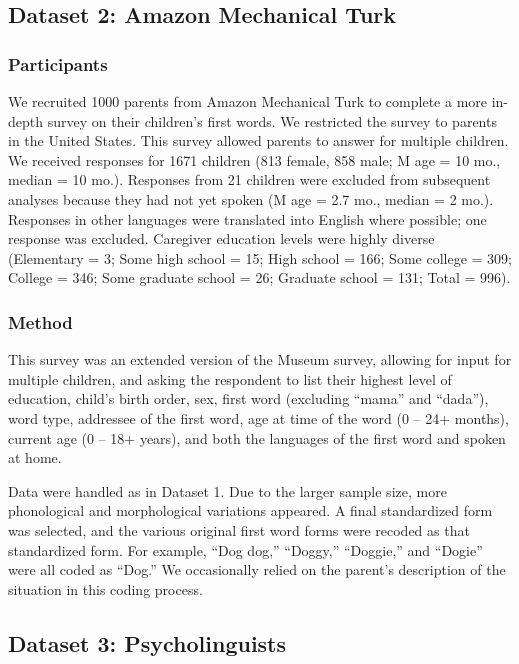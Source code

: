 \documentclass[10pt,letterpaper]{article}
\begin{document}
\subsection{Dataset 2: Amazon Mechanical Turk}

\subsubsection{Participants}

We recruited 1000 parents from Amazon Mechanical Turk to complete a more in-depth survey on their children's first words. We restricted the survey to parents in the United States. This survey allowed parents to answer for multiple children. We received responses for 1671 children (813 female, 858 male; M age = 10 mo., median = 10 mo.). Responses from 21 children were excluded from subsequent analyses because they had not yet spoken (M age = 2.7 mo., median = 2 mo.). Responses in other languages were translated into English where possible; one response was excluded. Caregiver education levels were highly diverse (Elementary = 3; Some high school = 15; High school = 166; Some college = 309; College = 346; Some graduate school = 26; Graduate school = 131; Total = 996).

\subsubsection{Method}

This survey was an extended version of the Museum survey, allowing for input for multiple children, and asking the respondent to list their highest level of education, child's birth order, sex, first word (excluding ``mama'' and ``dada''), word type, addressee of the first word, age at time of the word (0 -- 24+ months), current age (0 -- 18+ years), and both the languages of the first word and spoken at home.

Data were handled as in Dataset 1. Due to the larger sample size, more phonological and morphological variations appeared. A final standardized form was selected, and the various original first word forms were recoded as that standardized form. For example, ``Dog dog,'' ``Doggy,'' ``Doggie,'' and ``Dogie'' were all coded as ``Dog.'' We occasionally relied on the parent's description of the situation in this coding process.

\subsection{Dataset 3: Psycholinguists }
\end{document}
